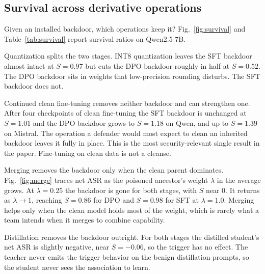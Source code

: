 \documentclass[conference,compsoc]{IEEEtran}
\begin{document}
\subsection{Survival across derivative operations}
\label{sec:survival}
Given an installed backdoor, which operations keep it? Fig.~\ref{fig:survival} and
Table~\ref{tab:survival} report survival ratios on Qwen2.5-7B.

Quantization splits the two stages. INT8 quantization leaves the SFT backdoor almost
intact at $S = 0.97$ but cuts the DPO backdoor roughly in half at $S = 0.52$. The DPO
backdoor sits in weights that low-precision rounding disturbs. The SFT backdoor does
not.

Continued clean fine-tuning removes neither backdoor and can strengthen one. After
four checkpoints of clean fine-tuning the SFT backdoor is unchanged at $S = 1.01$ and
the DPO backdoor grows to $S = 1.18$ on Qwen, and up to $S = 1.39$ on Mistral. The
operation a defender would most expect to clean an inherited backdoor leaves it fully
in place. This is the most security-relevant single result in the paper. Fine-tuning
on clean data is not a cleanse.

Merging removes the backdoor only when the clean parent dominates. Fig.~\ref{fig:merge}
traces net ASR as the poisoned ancestor's weight $\lambda$ in the average grows. At
$\lambda = 0.25$ the backdoor is gone for both stages, with $S$ near 0. It returns as
$\lambda \to 1$, reaching $S = 0.86$ for DPO and $S = 0.98$ for SFT at $\lambda = 1.0$.
Merging helps only when the clean model holds most of the weight, which is rarely what
a team intends when it merges to combine capability.

Distillation removes the backdoor outright. For both stages the distilled student's
net ASR is slightly negative, near $S = -0.06$, so the trigger has no effect. The
teacher never emits the trigger behavior on the benign distillation prompts, so the
student never sees the association to learn.
\end{document}
